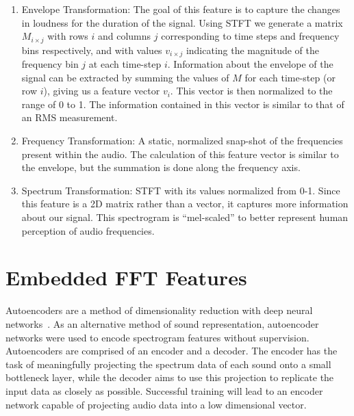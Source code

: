 \documentclass[\main/thesis.tex]{subfiles}
\begin{document}
\begin{enumerate}
\item Envelope Transformation: The goal of this feature is to capture the changes in loudness for the duration of the signal. Using STFT we generate a matrix $M_{i \times j}$ with rows $i$ and columns $j$ corresponding to time steps and frequency bins respectively, and with values $v_{i \times j}$ indicating the magnitude of the frequency bin $j$ at each time-step $i$. Information about the envelope of the signal can be extracted by summing the values of $M$ for each time-step (or row $i$), giving us a feature vector $v_i$. This vector is then normalized to the range of 0 to 1. The information contained in this vector is similar to that of an RMS measurement.
\item Frequency Transformation: A static, normalized snap-shot of the  frequencies present within the audio. The calculation of this feature vector is similar to the envelope, but the summation is done along the frequency axis.
\item Spectrum Transformation: STFT with its values normalized from 0-1. Since this feature is a 2D matrix rather than a vector, it captures more information about our signal. This spectrogram is \enquote{mel-scaled}\cite{stevens1940relation} to better represent human perception of audio frequencies.
\end{enumerate}
\section{Embedded FFT Features}
\label{section:embedded_feats}
% 
Autoencoders are a method of dimensionality reduction with deep neural networks~\cite{hinton1994autoencoders,hinton2006reducing}. As an alternative method of sound representation, autoencoder networks were used to encode spectrogram features without supervision. Autoencoders are comprised of an encoder and a decoder. The encoder has the task of meaningfully projecting the spectrum data of each sound onto a small bottleneck layer, while the decoder aims to use this projection to replicate the input data as closely as possible. Successful training will lead to an encoder network capable of projecting audio data into a low dimensional vector. 
\end{document}
